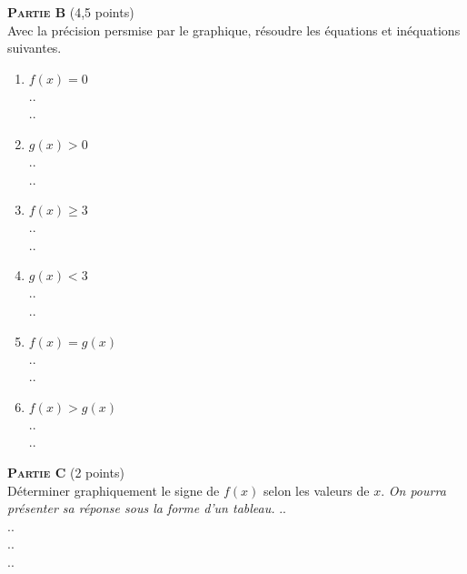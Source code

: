 \begin{exo}[9 points]
\medskip

\textsc{\textbf{Partie B}} (4,5 points)\\
Avec la pr\'ecision persmise par le graphique, r\'esoudre les \'equations et in\'equations suivantes.

\begin{multicols}{2}
 \begin{enumerate}
  \item $f(x)=0$\\
	.\dotfill.\\
	.\dotfill.
  \item $g(x)>0$\\
	.\dotfill.\\
	.\dotfill.
  \item $f(x)\geqslant 3$\\
	.\dotfill.\\
	.\dotfill. \sautcol
  \item $g(x)< 3$\\
	.\dotfill.\\
	.\dotfill. 
  \item $f(x)=g(x)$\\
	.\dotfill.\\
	.\dotfill.  
  \item $f(x)>g(x)$\\
	.\dotfill.\\
	.\dotfill.
 \end{enumerate} 
\end{multicols}

\medskip

\textsc{\textbf{Partie C}} (2 points)\\
D\'eterminer graphiquement le signe de $f(x)$ selon les valeurs de $x$. \emph{On pourra pr\'esenter sa r\'eponse sous la forme d'un tableau.}
.\dotfill.\\
.\dotfill.\\
.\dotfill.\\
.\dotfill.


\end{exo}



